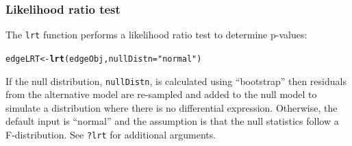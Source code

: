 \documentclass{article}\usepackage[]{graphicx}\usepackage[]{color}
\makeatletter
\newcommand{\hlstr}[1]{\textcolor[rgb]{0.192,0.494,0.8}{#1}}%
\newcommand{\hlstd}[1]{\textcolor[rgb]{0.345,0.345,0.345}{#1}}%
\newcommand{\hlkwb}[1]{\textcolor[rgb]{0.69,0.353,0.396}{#1}}%
\newcommand{\hlkwc}[1]{\textcolor[rgb]{0.333,0.667,0.333}{#1}}%
\newcommand{\hlkwd}[1]{\textcolor[rgb]{0.737,0.353,0.396}{\textbf{#1}}}%
\newenvironment{kframe}{%
 \def\at@end@of@kframe{}%
 \ifinner\ifhmode%
  \def\at@end@of@kframe{\end{minipage}}%
  \begin{minipage}{\columnwidth}%
 \fi\fi%
 \def\FrameCommand##1{\hskip\@totalleftmargin \hskip-\fboxsep
 \colorbox{shadecolor}{##1}\hskip-\fboxsep
     \hskip-\linewidth \hskip-\@totalleftmargin \hskip\columnwidth}%
 \MakeFramed {\advance\hsize-\width
   \@totalleftmargin\z@ \linewidth\hsize
   \@setminipage}}%
 {\par\unskip\endMakeFramed%
 \at@end@of@kframe}
\newenvironment{knitrout}{}{} %
\makeatother
\begin{document}
\subsubsection{Likelihood ratio test}
The {\tt lrt} function performs a likelihood ratio test to determine p-values:
\begin{knitrout}
\color{fgcolor}\begin{kframe}
\begin{alltt}
\hlstd{edgeLRT} \hlkwb{<-} \hlkwd{lrt}\hlstd{(edgeObj,} \hlkwc{nullDistn} \hlstd{=} \hlstr{"normal"}\hlstd{)}
\end{alltt}
\end{kframe}
\end{knitrout}
If the null distribution, {\tt nullDistn}, is calculated using ``bootstrap'' then residuals from the alternative model are re-sampled and added to the null model to simulate a distribution where there is no differential expression. Otherwise, the default input is ``normal'' and the assumption is that the null statistics follow a F-distribution. See {\tt ?lrt} for additional arguments.
\end{document}
